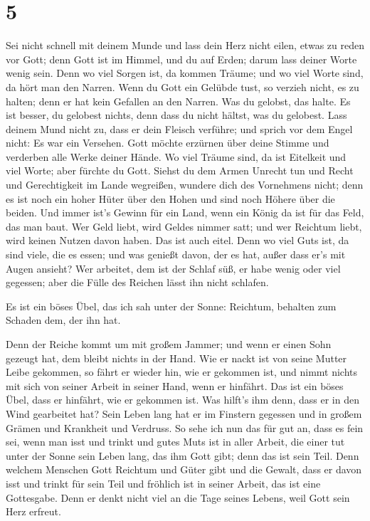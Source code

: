\hypertarget{section-4}{%
\section{5}\label{section-4}}

 Sei nicht schnell mit deinem Munde und lass dein Herz
nicht eilen, etwas zu reden vor Gott; denn Gott ist im Himmel, und du
auf Erden; darum lass deiner Worte wenig sein.  Denn wo
viel Sorgen ist, da kommen Träume; und wo viel Worte sind, da hört man
den Narren.  Wenn du Gott ein Gelübde tust, so verzieh
nicht, es zu halten; denn er hat kein Gefallen an den Narren. Was du
gelobst, das halte.  Es ist besser, du gelobest nichts,
denn dass du nicht hältst, was du gelobest.  Lass deinem
Mund nicht zu, dass er dein Fleisch verführe; und sprich vor dem Engel
nicht: Es war ein Versehen. Gott möchte erzürnen über deine Stimme und
verderben alle Werke deiner Hände.  Wo viel Träume sind,
da ist Eitelkeit und viel Worte; aber fürchte du Gott. 
Siehst du dem Armen Unrecht tun und Recht und Gerechtigkeit im Lande
wegreißen, wundere dich des Vornehmens nicht; denn es ist noch ein hoher
Hüter über den Hohen und sind noch Höhere über die beiden.
 Und immer ist's Gewinn für ein Land, wenn ein König da
ist für das Feld, das man baut.  Wer Geld liebt, wird
Geldes nimmer satt; und wer Reichtum liebt, wird keinen Nutzen davon
haben. Das ist auch eitel.  Denn wo viel Guts ist, da
sind viele, die es essen; und was genießt davon, der es hat, außer dass
er's mit Augen ansieht?  Wer arbeitet, dem ist der Schlaf
süß, er habe wenig oder viel gegessen; aber die Fülle des Reichen lässt
ihn nicht schlafen.

 Es ist ein böses Übel, das ich sah unter der Sonne:
Reichtum, behalten zum Schaden dem, der ihn hat.

 Denn der Reiche kommt um mit großem Jammer; und wenn er
einen Sohn gezeugt hat, dem bleibt nichts in der Hand. 
Wie er nackt ist von seine Mutter Leibe gekommen, so fährt er wieder
hin, wie er gekommen ist, und nimmt nichts mit sich von seiner Arbeit in
seiner Hand, wenn er hinfährt.  Das ist ein böses Übel,
dass er hinfährt, wie er gekommen ist. Was hilft's ihm denn, dass er in
den Wind gearbeitet hat?  Sein Leben lang hat er im
Finstern gegessen und in großem Grämen und Krankheit und Verdruss.
 So sehe ich nun das für gut an, dass es fein sei, wenn
man isst und trinkt und gutes Muts ist in aller Arbeit, die einer tut
unter der Sonne sein Leben lang, das ihm Gott gibt; denn das ist sein
Teil.  Denn welchem Menschen Gott Reichtum und Güter gibt
und die Gewalt, dass er davon isst und trinkt für sein Teil und fröhlich
ist in seiner Arbeit, das ist eine Gottesgabe.  Denn er
denkt nicht viel an die Tage seines Lebens, weil Gott sein Herz erfreut.

